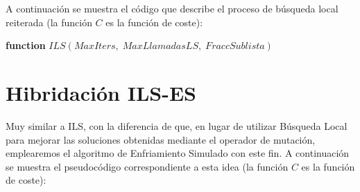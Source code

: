 \documentclass[11pt,a4paper]{article}
\begin{document}
	\noindent A continuación se muestra el código que describe el proceso de búsqueda local reiterada (la función $C$ es la función de coste):
		
	\begin{algorithm}
		
		\textbf{function} $ILS(MaxIters,\;MaxLlamadasLS,\;FraccSublista)$
			
	\end{algorithm}
		
\section{Hibridación ILS-ES}

	\noindent Muy similar a ILS, con la diferencia de que, en lugar de utilizar Búsqueda Local para mejorar las soluciones obtenidas mediante el operador de mutación, emplearemos el algoritmo de Enfriamiento Simulado con este fin. A continuación se muestra el pseudocódigo correspondiente a esta idea (la función $C$ es la función de coste):
\end{document}
